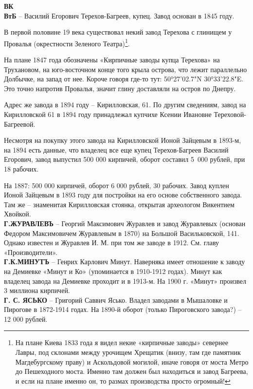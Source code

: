 \noindent\textbf{ВК}\\

\noindent\textbf{ВтБ} – Василий Егорович Терехов-Багреев, купец. Завод основан в 1845 году.

В первой половине 19 века существовал некий завод Терехова с глинищем у Провалья (окрестности Зеленого Театра)\footnote{На плане Киева 1833 года я видел некие «кирпичные заводы» севернее Лавры, под склонами между урочищем Хрещатик (внизу, там где памятник Магдебургскому праву) и Аскольдовой могилой, иначе говоря от моста Метро до Пешеходного моста. Именно там должен был находиться и завод Багреева, и если на плане именно он, то размах производства просто огромный!}. 

На плане 1847 года обозначены «Кирпичные заводы купца Терехова» на Трухановом, на юго-восточном конце того крыла острова, что лежит параллельно Долбычке, на запад от нее. Короче говоря где-то тут: 50°27'02.7"N 30°33'22.8"E. Это точно напротив Провалья, значит глину доставляли на остров по Днепру.

Адрес же завода в 1894 году – Кирилловская, 61. По другим сведениям, завод на Кирилловской 61 в 1894 году принадлежал купчихе Ксении Ивановне Тереховой-Багреевой.

Несмотря на покупку этого завода на Кирилловской Ионой Зайцевым в 1893-м, на 1894 есть данные, что владелец все еще купец Терехов-Багреев Василий Егорович, завод выпустил 500 000 кирпичей, оборот составил \mbox{5 000} рублей, при 18 рабочих.

На 1887: 500 000 кирпичей, оборот 6 000 рублей, 30 рабочих. Завод куплен Ионой Зайцевым в 1893 году для постройки на его основе собственного завода. Там же – знаменитая Кирилловская стоянка, открытая археологом Викентием Хвойкой.\\

\noindent\textbf{Г.ЖУРАВЛЕВЪ} – Георгий Максимович Журавлев и завод Журавлевых (основан Федором Максимовичем Журавлевым в 1870) на Большой Васильковской, 141. Однако известен и Журавлев И. М. при том же заводе в 1912. См. главу «Производители».\\

\noindent\textbf{Г.К.МИНУТЪ} – Генрих Карлович Минут. Наверняка имеет отношение к заводу на Демиевке «Минут и Ко» (упоминается в 1910-1912 годах). Минут как владелец завода на Демиевке проходит и в 1913-м. На 1900 г. «Минут» произвел 3 миллиона кирпичей.\\

\noindent\textbf{Г. С. ЯСЬКО} – Григорий Саввич Ясько. Владел заводами в Мышаловке и Пирогове в 1872-1914 годах. На 1890-й оборот (только Пироговского завода?) – 12 000 рублей. 

